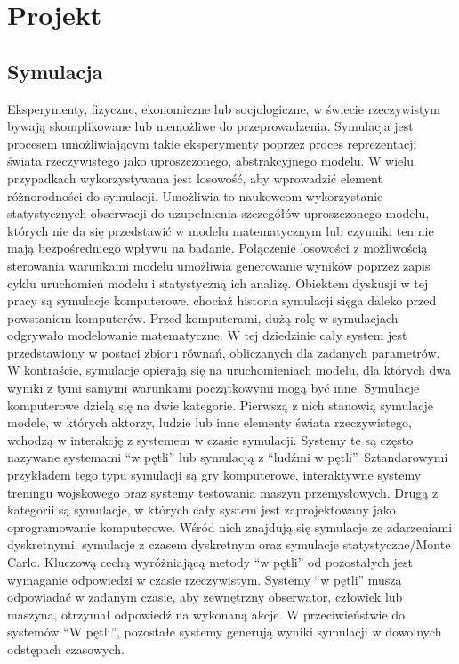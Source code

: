 \section{Projekt}\label{projekt}

\subsection{\texorpdfstring{Symulacja \autocite{Hartmann:simulation:2005} \autocite{hartmann:2015:bigsim}}{Symulacja  }}\label{symulacja}

Eksperymenty, fizyczne, ekonomiczne lub socjologiczne, w świecie rzeczywistym bywają skomplikowane lub niemożliwe do przeprowadzenia. Symulacja jest procesem umożliwiającym takie eksperymenty poprzez proces reprezentacji świata rzeczywistego jako uproszczonego, abstrakcyjnego modelu. W wielu przypadkach wykorzystywana jest losowość, aby wprowadzić element różnorodności do symulacji. Umożliwia to naukowcom wykorzystanie statystycznych obserwacji do uzupełnienia szczegółów uproszczonego modelu, których nie da się przedstawić w modelu matematycznym lub czynniki ten nie mają bezpośredniego wpływu na badanie. Połączenie losowości z możliwością sterowania warunkami modelu umożliwia generowanie wyników poprzez zapis cyklu uruchomień modelu i statystyczną ich analizę. Obiektem dyskusji w tej pracy są symulacje komputerowe. chociaż historia symulacji sięga daleko przed powstaniem komputerów. Przed komputerami, dużą rolę w symulacjach odgrywało modelowanie matematyczne. W tej dziedzinie cały system jest przedstawiony w postaci zbioru równań, obliczanych dla zadanych parametrów. W kontraście, symulacje opierają się na uruchomieniach modelu, dla których dwa wyniki z tymi samymi warunkami początkowymi mogą być inne. Symulacje komputerowe dzielą się na dwie kategorie. Pierwszą z nich stanowią symulacje modele, w których aktorzy, ludzie lub inne elementy świata rzeczywistego, wchodzą w interakcję z systemem w czasie symulacji. Systemy te są często nazywane systemami ``w pętli'' lub symulacją z ``ludźmi w pętli''. Sztandarowymi przykładem tego typu symulacji są gry komputerowe, interaktywne systemy treningu wojskowego oraz systemy testowania maszyn przemysłowych. Drugą z kategorii są symulacje, w których cały system jest zaprojektowany jako oprogramowanie komputerowe. Wśród nich znajdują się symulacje ze zdarzeniami dyskretnymi, symulacje z czasem dyskretnym oraz symulacje statystyczne/Monte Carlo. Kluczową cechą wyróżniającą metody ``w pętli'' od pozostałych jest wymaganie odpowiedzi w czasie rzeczywistym. Systemy ``w pętli'' muszą odpowiadać w zadanym czasie, aby zewnętrzny obserwator, człowiek lub maszyna, otrzymał odpowiedź na wykonaną akcje. W przeciwieństwie do systemów ``W pętli'', pozostałe systemy generują wyniki symulacji w dowolnych odstępach czasowych.

